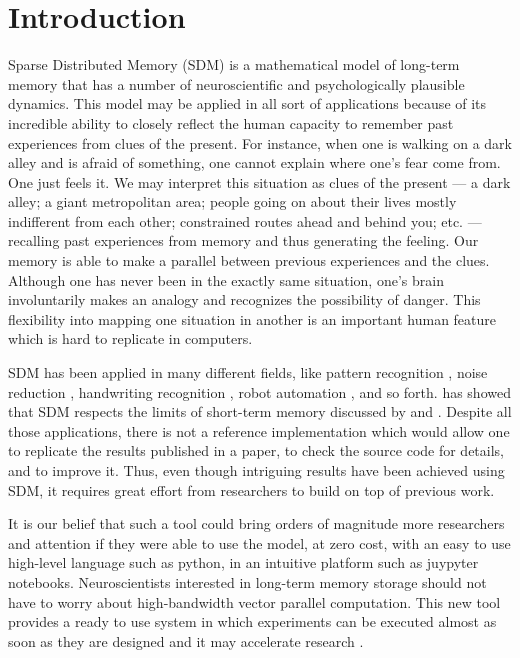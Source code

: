 
\chapter{Introduction}

Sparse Distributed Memory (SDM) \citep{Kanerva1988} is a mathematical model of long-term memory that has a number of neuroscientific and psychologically plausible dynamics. This model may be applied in all sort of applications because of its incredible ability to closely reflect the human capacity to remember past experiences from clues of the present. For instance, when one is walking on a dark alley and is afraid of something, one cannot explain where one's fear come from. One just feels it. We may interpret this situation as clues of the present --- a dark alley; a giant metropolitan area; people going on about their lives mostly indifferent from each other; constrained routes ahead and behind you; etc. --- recalling past experiences from memory and thus generating the feeling. Our memory is able to make a parallel between previous experiences and the clues. Although one has never been in the exactly same situation, one's brain involuntarily makes an analogy and recognizes the possibility of danger. This flexibility into mapping one situation in another is an important human feature which is hard to replicate in computers.

SDM has been applied in many different fields, like pattern recognition \citep{norman2003modeling, rao1995natural}, noise reduction \citep{Meng2009}, handwriting recognition \citep{fan1997genetic}, robot automation \citep{Rajesh1998, mendes2008robot}, and so forth. \citet{Linhares2011} has showed that SDM respects the limits of short-term memory discussed by \citet{Miller1995} and \citet{Cowan2011}. Despite all those applications, there is not a reference implementation which would allow one to replicate the results published in a paper, to check the source code for details, and to improve it. Thus, even though intriguing results have been achieved using SDM, it requires great effort from researchers to build on top of previous work.

It is our belief that such a tool could bring orders of magnitude more researchers and attention if they were able to use the model, at zero cost, with an easy to use high-level language such as python, in an intuitive platform such as juypyter notebooks. Neuroscientists interested in long-term memory storage should not have to worry about high-bandwidth vector parallel computation.  This new tool provides a ready to use system in which experiments can be executed almost as soon as they are designed and it may accelerate research \citep{shen2014interactive}.

